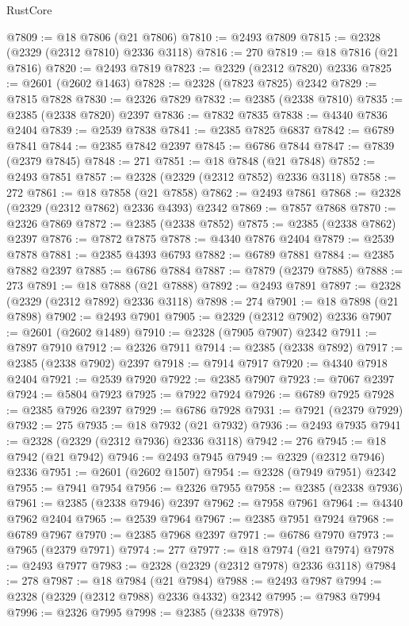 \begin{lexlean}{RustCore}
\begin{coremodule}
@7809 := @18 @7806 (@21 @7806)
@7810 := @2493 @7809
@7815 := @2328 (@2329 (@2312 @7810) @2336 @3118)
@7816 := 270
@7819 := @18 @7816 (@21 @7816)
@7820 := @2493 @7819
@7823 := @2329 (@2312 @7820) @2336
@7825 := @2601 (@2602 @1463)
@7828 := @2328 (@7823 @7825) @2342
@7829 := @7815 @7828
@7830 := @2326 @7829
@7832 := @2385 (@2338 @7810)
@7835 := @2385 (@2338 @7820) @2397
@7836 := @7832 @7835
@7838 := @4340 @7836 @2404
@7839 := @2539 @7838
@7841 := @2385 @7825 @6837
@7842 := @6789 @7841
@7844 := @2385 @7842 @2397
@7845 := @6786 @7844
@7847 := @7839 (@2379 @7845)
@7848 := 271
@7851 := @18 @7848 (@21 @7848)
@7852 := @2493 @7851
@7857 := @2328 (@2329 (@2312 @7852) @2336 @3118)
@7858 := 272
@7861 := @18 @7858 (@21 @7858)
@7862 := @2493 @7861
@7868 := @2328 (@2329 (@2312 @7862) @2336 @4393) @2342
@7869 := @7857 @7868
@7870 := @2326 @7869
@7872 := @2385 (@2338 @7852)
@7875 := @2385 (@2338 @7862) @2397
@7876 := @7872 @7875
@7878 := @4340 @7876 @2404
@7879 := @2539 @7878
@7881 := @2385 @4393 @6793
@7882 := @6789 @7881
@7884 := @2385 @7882 @2397
@7885 := @6786 @7884
@7887 := @7879 (@2379 @7885)
@7888 := 273
@7891 := @18 @7888 (@21 @7888)
@7892 := @2493 @7891
@7897 := @2328 (@2329 (@2312 @7892) @2336 @3118)
@7898 := 274
@7901 := @18 @7898 (@21 @7898)
@7902 := @2493 @7901
@7905 := @2329 (@2312 @7902) @2336
@7907 := @2601 (@2602 @1489)
@7910 := @2328 (@7905 @7907) @2342
@7911 := @7897 @7910
@7912 := @2326 @7911
@7914 := @2385 (@2338 @7892)
@7917 := @2385 (@2338 @7902) @2397
@7918 := @7914 @7917
@7920 := @4340 @7918 @2404
@7921 := @2539 @7920
@7922 := @2385 @7907
@7923 := @7067 @2397
@7924 := @5804 @7923
@7925 := @7922 @7924
@7926 := @6789 @7925
@7928 := @2385 @7926 @2397
@7929 := @6786 @7928
@7931 := @7921 (@2379 @7929)
@7932 := 275
@7935 := @18 @7932 (@21 @7932)
@7936 := @2493 @7935
@7941 := @2328 (@2329 (@2312 @7936) @2336 @3118)
@7942 := 276
@7945 := @18 @7942 (@21 @7942)
@7946 := @2493 @7945
@7949 := @2329 (@2312 @7946) @2336
@7951 := @2601 (@2602 @1507)
@7954 := @2328 (@7949 @7951) @2342
@7955 := @7941 @7954
@7956 := @2326 @7955
@7958 := @2385 (@2338 @7936)
@7961 := @2385 (@2338 @7946) @2397
@7962 := @7958 @7961
@7964 := @4340 @7962 @2404
@7965 := @2539 @7964
@7967 := @2385 @7951 @7924
@7968 := @6789 @7967
@7970 := @2385 @7968 @2397
@7971 := @6786 @7970
@7973 := @7965 (@2379 @7971)
@7974 := 277
@7977 := @18 @7974 (@21 @7974)
@7978 := @2493 @7977
@7983 := @2328 (@2329 (@2312 @7978) @2336 @3118)
@7984 := 278
@7987 := @18 @7984 (@21 @7984)
@7988 := @2493 @7987
@7994 := @2328 (@2329 (@2312 @7988) @2336 @4332) @2342
@7995 := @7983 @7994
@7996 := @2326 @7995
@7998 := @2385 (@2338 @7978)

\end{coremodule}
\end{lexlean}

